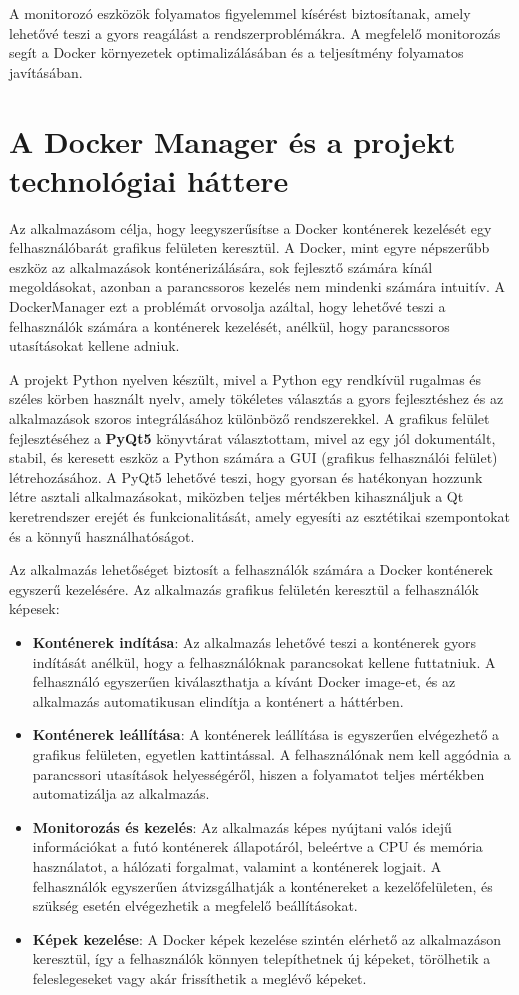 A monitorozó eszközök folyamatos figyelemmel kísérést biztosítanak, amely lehetővé teszi a gyors reagálást a rendszerproblémákra. A megfelelő monitorozás segít a Docker környezetek optimalizálásában és a teljesítmény folyamatos javításában.


\section{A Docker Manager és a projekt technológiai háttere}

Az alkalmazásom célja, hogy leegyszerűsítse a Docker konténerek kezelését egy felhasználóbarát grafikus felületen keresztül. A Docker, mint egyre népszerűbb eszköz az alkalmazások konténerizálására, sok fejlesztő számára kínál megoldásokat, azonban a parancssoros kezelés nem mindenki számára intuitív. A DockerManager ezt a problémát orvosolja azáltal, hogy lehetővé teszi a felhasználók számára a konténerek kezelését, anélkül, hogy parancssoros utasításokat kellene adniuk.

A projekt Python nyelven készült, mivel a Python egy rendkívül rugalmas és széles körben használt nyelv, amely tökéletes választás a gyors fejlesztéshez és az alkalmazások szoros integrálásához különböző rendszerekkel. A grafikus felület fejlesztéséhez a \textbf{PyQt5} könyvtárat választottam, mivel az egy jól dokumentált, stabil, és keresett eszköz a Python számára a GUI (grafikus felhasználói felület) létrehozásához. A PyQt5 lehetővé teszi, hogy gyorsan és hatékonyan hozzunk létre asztali alkalmazásokat, miközben teljes mértékben kihasználjuk a Qt keretrendszer erejét és funkcionalitását, amely egyesíti az esztétikai szempontokat és a könnyű használhatóságot.

Az alkalmazás lehetőséget biztosít a felhasználók számára a Docker konténerek egyszerű kezelésére. Az alkalmazás grafikus felületén keresztül a felhasználók képesek:
\begin{itemize}
	\item \textbf{Konténerek indítása}: Az alkalmazás lehetővé teszi a konténerek gyors indítását anélkül, hogy a felhasználóknak parancsokat kellene futtatniuk. A felhasználó egyszerűen kiválaszthatja a kívánt Docker image-et, és az alkalmazás automatikusan elindítja a konténert a háttérben.
	\item \textbf{Konténerek leállítása}: A konténerek leállítása is egyszerűen elvégezhető a grafikus felületen, egyetlen kattintással. A felhasználónak nem kell aggódnia a parancssori utasítások helyességéről, hiszen a folyamatot teljes mértékben automatizálja az alkalmazás.
	\item \textbf{Monitorozás és kezelés}: Az alkalmazás képes nyújtani valós idejű információkat a futó konténerek állapotáról, beleértve a CPU és memória használatot, a hálózati forgalmat, valamint a konténerek logjait. A felhasználók egyszerűen átvizsgálhatják a konténereket a kezelőfelületen, és szükség esetén elvégezhetik a megfelelő beállításokat.
	\item \textbf{Képek kezelése}: A Docker képek kezelése szintén elérhető az alkalmazáson keresztül, így a felhasználók könnyen telepíthetnek új képeket, törölhetik a feleslegeseket vagy akár frissíthetik a meglévő képeket.
\end{itemize}

